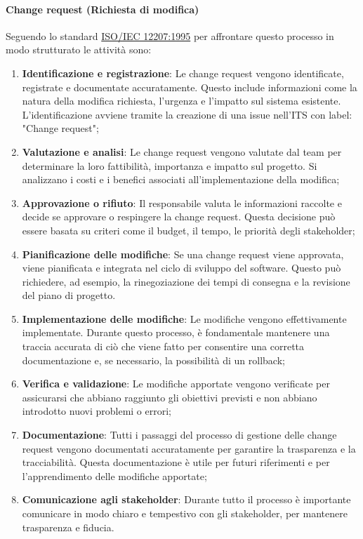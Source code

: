 \paragraph{Change request (Richiesta di modifica)}
Seguendo lo standard \href{https://www.math.unipd.it/~tullio/IS-1/2009/Approfondimenti/ISO_12207-1995.pdf}{ISO/IEC 12207:1995} per affrontare questo processo in modo strutturato le attività sono:
\begin{enumerate}
    \item \textbf{Identificazione e registrazione}: Le change request vengono identificate, registrate e documentate accuratamente. Questo include informazioni come la natura della modifica richiesta, l'urgenza e l'impatto sul sistema esistente. \\
    L'identificazione avviene tramite la creazione di una issue nell'ITS con label: "Change request";
    \item \textbf{Valutazione e analisi}: Le change request vengono valutate dal team per determinare la loro fattibilità, importanza e impatto sul progetto. Si analizzano i costi e i benefici associati all'implementazione della modifica;
    \item \textbf{Approvazione o rifiuto}: Il responsabile valuta le informazioni raccolte e decide se approvare o respingere la change request. Questa decisione può essere basata su criteri come il budget, il tempo, le priorità degli stakeholder;
    \item \textbf{Pianificazione delle modifiche}: Se una change request viene approvata, viene pianificata e integrata nel ciclo di sviluppo del software. Questo può richiedere, ad esempio, la rinegoziazione dei tempi di consegna e la revisione del piano di progetto.
    \item \textbf{Implementazione delle modifiche}: Le modifiche vengono effettivamente implementate. Durante questo processo, è fondamentale mantenere una traccia accurata di ciò che viene fatto per consentire una corretta documentazione e, se necessario, la possibilità di un rollback;
    \item \textbf{Verifica e validazione}: Le modifiche apportate vengono verificate per assicurarsi che abbiano raggiunto gli obiettivi previsti e non abbiano introdotto nuovi problemi o errori;
    \item \textbf{Documentazione}: Tutti i passaggi del processo di gestione delle change request vengono documentati accuratamente per garantire la trasparenza e la tracciabilità. Questa documentazione è utile per futuri riferimenti e per l'apprendimento delle modifiche apportate;
    \item \textbf{Comunicazione agli stakeholder}: Durante tutto il processo è importante comunicare in modo chiaro e tempestivo con gli stakeholder, per mantenere trasparenza e fiducia.
\end{enumerate}


